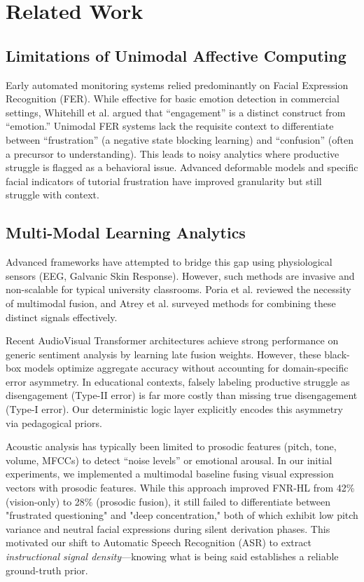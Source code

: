 \documentclass[conference]{IEEEtran}
\begin{document}
\section{Related Work}

\subsection{Limitations of Unimodal Affective Computing}
Early automated monitoring systems relied predominantly on Facial Expression Recognition (FER). While effective for basic emotion detection in commercial settings, Whitehill et al. \cite{b7} argued that ``engagement'' is a distinct construct from ``emotion.'' Unimodal FER systems lack the requisite context to differentiate between ``frustration'' (a negative state blocking learning) and ``confusion'' (often a precursor to understanding). This leads to noisy analytics where productive struggle is flagged as a behavioral issue. Advanced deformable models and specific facial indicators of tutorial frustration have improved granularity but still struggle with context.

\subsection{Multi-Modal Learning Analytics}
Advanced frameworks have attempted to bridge this gap using physiological sensors (EEG, Galvanic Skin Response). However, such methods are invasive and non-scalable for typical university classrooms. Poria et al. \cite{b10} reviewed the necessity of multimodal fusion, and Atrey et al. surveyed methods for combining these distinct signals effectively.

Recent AudioVisual Transformer architectures achieve strong performance on generic sentiment analysis by learning late fusion weights. However, these black-box models optimize aggregate accuracy without accounting for domain-specific error asymmetry. In educational contexts, falsely labeling productive struggle as disengagement (Type-II error) is far more costly than missing true disengagement (Type-I error). Our deterministic logic layer explicitly encodes this asymmetry via pedagogical priors.

Acoustic analysis has typically been limited to prosodic features (pitch, tone, volume, MFCCs) to detect ``noise levels'' or emotional arousal. In our initial experiments, we implemented a multimodal baseline fusing visual expression vectors with prosodic features. While this approach improved FNR-HL from 42\% (vision-only) to 28\% (prosodic fusion), it still failed to differentiate between "frustrated questioning" and "deep concentration," both of which exhibit low pitch variance and neutral facial expressions during silent derivation phases. This motivated our shift to Automatic Speech Recognition (ASR) to extract \textit{instructional signal density}—knowing what is being said establishes a reliable ground-truth prior.
\end{document}

